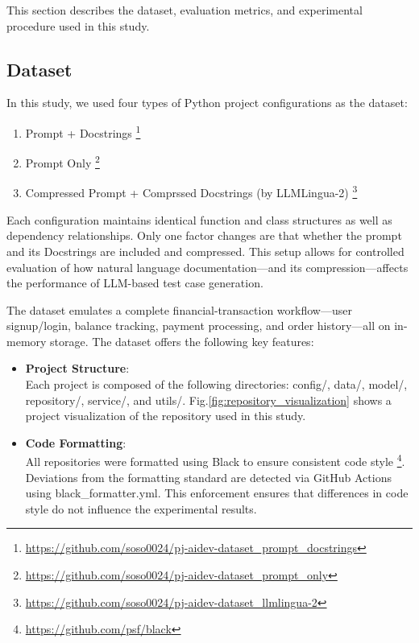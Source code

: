 This section describes the dataset, evaluation metrics, and experimental procedure used in this study.

\subsection{Dataset}

In this study, we used four types of Python project configurations as the dataset:

\begin{enumerate}
    \item Prompt + Docstrings \footnote{\url{https://github.com/soso0024/pj-aidev-dataset_prompt_docstrings}}
\vspace{0.2cm}
    \item Prompt Only \footnote{\url{https://github.com/soso0024/pj-aidev-dataset_prompt_only}}
\vspace{0.2cm}
    \item Compressed Prompt + Comprssed Docstrings (by LLMLingua-2) \footnote{\url{https://github.com/soso0024/pj-aidev-dataset_llmlingua-2}}
\end{enumerate}

Each configuration maintains identical function and class structures as well as dependency relationships. Only one factor changes are that whether the prompt and its Docstrings are included and compressed. This setup allows for controlled evaluation of how natural language documentation—and its compression—affects the performance of LLM-based test case generation. 

The dataset emulates a complete financial-transaction workflow—user signup/login, balance tracking, payment processing, and order history—all on in-memory storage. The dataset offers the following key features:

\begin{itemize}[label={$\bullet$}]
    \item \textbf{Project Structure}:\\Each project is composed of the following directories: config/, data/, model/, repository/, service/, and utils/. Fig.\ref{fig:repository_visualization} shows a project visualization of the repository used in this study.
\vspace{0.2cm}
    \item \textbf{Code Formatting}:\\All repositories were formatted using Black to ensure consistent code style \footnote{\url{https://github.com/psf/black}}. Deviations from the formatting standard are detected via GitHub Actions using black\_formatter.yml. This enforcement ensures that differences in code style do not influence the experimental results.
\end{itemize}

